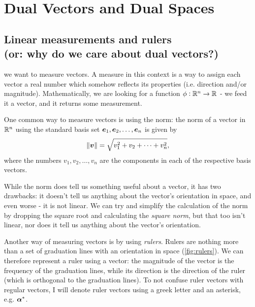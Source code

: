 \section{Dual Vectors and Dual Spaces}

\subsection{Linear measurements and rulers\\(or: why do we care about dual vectors?)}
 we want to measure vectors. A measure in this context is a way to assign each vector a real number which somehow reflects its properties (i.e. direction and/or magnitude). Mathematically, we are looking for a function $\phi:\Rs[n]\to\Rs$ - we feed it a vector, and it returns some measurement.

One common way to measure vectors is using the norm: the norm of a vector in $\Rs[n]$ using the standard basis set $\eb{1},\eb{2},\dots,\eb{n}$ is given by
\begin{equation}
    \vnorm{v} = \sqrt{v_{1}^{2}+v_{2}+\dots+v_{n}^{2}},
    \label{eq:std_norm}
\end{equation}
where the numbers $v_{1},v_{2},\dots,v_{n}$ are the components in each of the respective basis vectors.

While the norm does tell us something useful about a vector, it has two drawbacks: it doesn't tell us anything about the vector's orientation in space, and even worse - it is not linear. We can try and simplify the calculation of the norm by dropping the square root and calculating the \textit{square norm}, but that too isn't linear, nor does it tell us anything about the vector's orientation.

Another way of measuring vectors is by using \textit{rulers}. Rulers are nothing more than a set of graduation lines with an orientation in space (\autoref{fig:rulers}). We can therefore represent a ruler using a vector: the magnitude of the vector is the frequency of the graduation lines, while its direction is the direction of the ruler (which is orthogonal to the graduation lines). To not confuse ruler vectors with regular vectors, I will denote ruler vectors using a greek letter and an asterisk, e.g. $\dualvec{\alpha}$.

